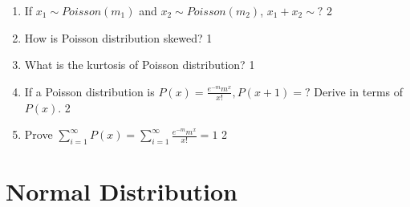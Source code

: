 \documentclass[a4paper,oneside, margin=1.4in]{book}
\begin{document}
\begin{enumerate}
\item If $x_1 \sim Poisson (m_1)$ and  $x_2 \sim Poisson (m_2)$,  $x_1 + x_2 \sim ?$ \hfill 2

\item How is Poisson distribution skewed? \hfill 1

\item What is the kurtosis of Poisson distribution? \hfill 1

\item If a Poisson distribution is $P(x) = \frac{e^{-m}m^x}{x!}, P(x+1) = ?$ Derive in terms of $P(x)$. \hfill 2

\item Prove $\displaystyle \sum_{i=1}^{\infty} P(x) = \sum_{i=1}^{\infty} \frac{e^{-m} m^x}{x!} = 1$ \hfill 2
\end{enumerate}


\chapter{Normal Distribution} 
\end{document}
